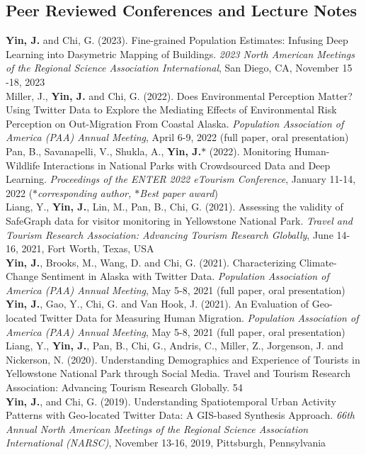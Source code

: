 \documentclass[11pt, a4paper]{article}
\newcommand{\years}[1]{\marginnote{\scriptsize #1}}
\begin{document}
\subsection*{Peer Reviewed Conferences and Lecture Notes}
\noindent
\years{2023}\textbf{Yin, J.} and Chi, G. (2023). Fine-grained Population Estimates: Infusing Deep Learning into Dasymetric Mapping of Buildings. \textit{2023 North American Meetings of the Regional Science Association International}, San Diego, CA, November 15 -18, 2023\\
\years{2022}Miller, J., \textbf{Yin, J.} and Chi, G. (2022). Does Environmental Perception Matter? Using Twitter Data to Explore the Mediating Effects of Environmental Risk Perception on Out-Migration From Coastal Alaska. \textit{Population Association of America (PAA) Annual Meeting}, April 6-9, 2022 (full paper, oral presentation)\\
\years{2022}Pan, B., Savanapelli, V., Shukla, A., \textbf{Yin, J.$*$} (2022). Monitoring Human-Wildlife Interactions in National Parks with Crowdsourced Data and Deep Learning. \textit{ Proceedings of the ENTER 2022 eTourism Conference}, January 11-14, 2022 (\textit{$*$corresponding author, \emph{$*$Best paper award}})\\
\years{2021}Liang, Y., \textbf{Yin, J.}, Lin, M., Pan, B., Chi, G. (2021). Assessing the validity of SafeGraph data for visitor monitoring in Yellowstone National Park. \textit{ Travel and Tourism Research Association: Advancing Tourism Research Globally}, June 14-16, 2021, Fort Worth, Texas, USA\\
\years{2021}\textbf{Yin, J.},  Brooks, M., Wang, D. and Chi, G. (2021). Characterizing Climate-Change Sentiment in Alaska with Twitter Data. \textit{Population Association of America (PAA) Annual Meeting}, May 5-8, 2021 (full paper, oral presentation)\\
\years{2021}\textbf{Yin, J.}, Gao, Y., Chi, G. and Van Hook, J. (2021). An Evaluation of Geo-located Twitter Data for Measuring Human Migration. \textit{Population Association of America (PAA) Annual Meeting}, May 5-8, 2021 (full paper, oral presentation)\\
\years{2020}Liang, Y., \textbf{Yin, J.}, Pan, B., Chi, G., Andris, C., Miller, Z., Jorgenson, J. and Nickerson, N. (2020). Understanding Demographics and Experience of Tourists in Yellowstone National Park through Social Media. Travel and Tourism Research Association: Advancing Tourism Research Globally. 54 \\
\years{2019}\textbf{Yin, J.}, and Chi, G. (2019). Understanding Spatiotemporal Urban Activity Patterns with Geo-located Twitter Data: A GIS-based Synthesis Approach. \textit{66th Annual North American Meetings of the Regional Science Association International (NARSC)}, November 13-16, 2019, Pittsburgh, Pennsylvania\\
\end{document}
